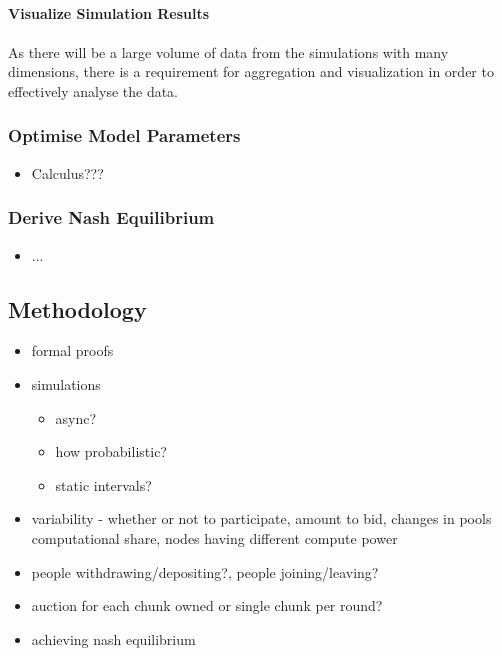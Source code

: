 \paragraph{Visualize Simulation Results}

\paragraph{} As there will be a large volume of data from the simulations with many dimensions, there is a requirement for aggregation and visualization in order to effectively analyse the data.

\subsubsection{Optimise Model Parameters}

\begin{itemize}
  \item Calculus???
\end{itemize}

\subsubsection{Derive Nash Equilibrium}

\begin{itemize}
  \item ...
\end{itemize}

\subsection{Methodology}

\begin{itemize}
  \item formal proofs
  \item simulations
    \begin{itemize}
      \item async?
      \item how probabilistic?
      \item static intervals?
    \end{itemize}
  \item variability - whether or not to participate, amount to bid, changes in pools computational share, nodes having different compute power
  \item people withdrawing/depositing?, people joining/leaving?
  \item auction for each chunk owned or single chunk per round?
  \item achieving nash equilibrium
\end{itemize}

